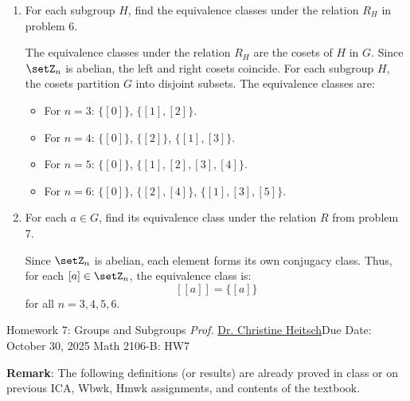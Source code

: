 \begin{enumerate}
\begin{enumerate}
    \item For each subgroup $H$, find the equivalence classes under the relation $R_H$ in problem 6.
    \begin{subanswer}
      The equivalence classes under the relation $R_H$ are the cosets of $H$ in $G$.
      Since $\setZ_n$ is abelian, the left and right cosets coincide.
      For each subgroup $H$, the cosets partition $G$ into disjoint subsets.
      The equivalence classes are:
      \begin{itemize}
        \item For $n=3$: $\{[0]\}$, $\{[1], [2]\}$.
        \item For $n=4$: $\{[0]\}$, $\{[2]\}$, $\{[1], [3]\}$.
        \item For $n=5$: $\{[0]\}$, $\{[1], [2], [3], [4]\}$.
        \item For $n=6$: $\{[0]\}$, $\{[2], [4]\}$, $\{[1], [3], [5]\}$.
      \end{itemize}
    \end{subanswer}
    \item For each $a \in G$, find its equivalence class under the relation $R$ from problem 7.
    \begin{subanswer}
      Since $\setZ_n$ is abelian, each element forms its own conjugacy class.
      Thus, for each $[a] \in \setZ_n$, the equivalence class is:
      \[
        [ [a] ] = \{ [a] \}
      \]
      for all $n=3,4,5,6$.
    \end{subanswer}
  \end{enumerate}
\end{enumerate}


























\newpage{}
{Homework 7: Groups and Subgroups}
{\textit{Prof.} \href{https://ceheitsch.github.io/webpage/}{Dr. Christine Heitsch}}{Due Date: October 30, 2025}
{Math 2106-B: HW7}


\newpage
\textbf{Remark}: The following definitions (or results) are already proved in class or on previous ICA, 
Wbwk, Hmwk assignments, and contents of the textbook.





